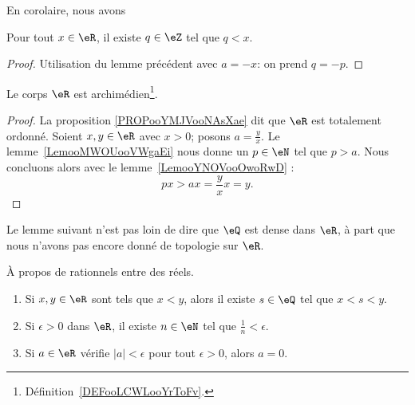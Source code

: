 En corolaire, nous avons
\begin{lemma}      \label{LEMooMWOUooVWgbFi}
	Pour tout \( x\in \eR\), il existe \( q\in \eZ\) tel que \( q < x\).
\end{lemma}
\begin{proof}
	Utilisation du lemme précédent avec \( a = -x \): on prend \( q = -p \).
\end{proof}

\begin{theorem}        \label{ThoooKJTTooCaxEny}
	Le corps \( \eR\) est archimédien\footnote{Définition~\ref{DEFooLCWLooYrToFv}.}.
\end{theorem}

\begin{proof}
	La proposition \ref{PROPooYMJVooNAsXae} dit que \( \eR\) est totalement ordonné. Soient \( x,y\in \eR\) avec \( x>0\); posons \( a=\frac{ y }{ x }\). Le lemme~\ref{LemooMWOUooVWgaEi} nous donne un \( p \in \eN\) tel que \(p > a\). Nous concluons alors avec le lemme~\ref{LemooYNOVooOwoRwD} :
	\begin{equation}
		px>ax=\frac{ y }{ x }x=y.
	\end{equation}
\end{proof}

Le lemme suivant n'est pas loin de dire que \( \eQ\) est dense dans \( \eR\), à part que nous n'avons pas encore donné de topologie sur \( \eR\).
\begin{lemma}       \label{LemooHLHTooTyCZYL}
	À propos de rationnels entre des réels.
	\begin{enumerate}
		\item       \label{ITEMooGVTMooQsoTCi}
		      Si \( x,y\in \eR\) sont tels que \( x<y\), alors il existe \( s\in \eQ\) tel que \( x<s<y\).
		\item       \label{ITEMooCVDSooAjimCL}
		      Si \( \epsilon>0\) dans \( \eR\), il existe \( n\in \eN\) tel que  \( \frac{1}{ n }<\epsilon\).
		\item		\label{ITEMooASUXooImjqzK}
		      Si \( a\in \eR\) vérifie \( | a |<\epsilon\) pour tout \( \epsilon>0\), alors \( a=0\).
	\end{enumerate}
\end{lemma}

